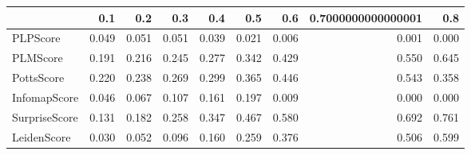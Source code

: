\begin{tabular}{lrrrrrrrr}
\toprule
{} &   0.1 &   0.2 &   0.3 &   0.4 &   0.5 &   0.6 & 0.7000000000000001 &   0.8 \\
\midrule
PLPScore      & 0.049 & 0.051 & 0.051 & 0.039 & 0.021 & 0.006 &              0.001 & 0.000 \\
PLMScore      & 0.191 & 0.216 & 0.245 & 0.277 & 0.342 & 0.429 &              0.550 & 0.645 \\
PottsScore    & 0.220 & 0.238 & 0.269 & 0.299 & 0.365 & 0.446 &              0.543 & 0.358 \\
InfomapScore  & 0.046 & 0.067 & 0.107 & 0.161 & 0.197 & 0.009 &              0.000 & 0.000 \\
SurpriseScore & 0.131 & 0.182 & 0.258 & 0.347 & 0.467 & 0.580 &              0.692 & 0.761 \\
LeidenScore   & 0.030 & 0.052 & 0.096 & 0.160 & 0.259 & 0.376 &              0.506 & 0.599 \\
\bottomrule
\end{tabular}
